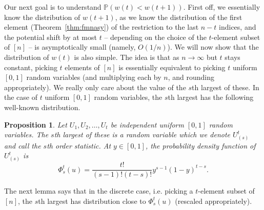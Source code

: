 \documentclass{amsart}
\newtheorem{proposition}[theorem]{Proposition}
\theoremstyle{definition}
\begin{document}
Our next goal is to understand $\mathbb{P}(w(t)<w(t+1))$. First off, we essentially know the distribution of $w(t+1)$, as we know the distribution of the first element (Theorem~\ref{thm:fmnasy}) of the restriction to the last $n-t$ indices, and the potential shift by at most $t$ -- depending on the choice of the $t$-element subset of $[n]$ -- is asymptotically small (namely, $O(1/n)$). We will now show that the distribution of $w(t)$ is also simple. The idea is that as $n\to \infty$ but $t$ stays constant, picking $t$ elements of $[n]$ is essentially equivalent to picking $t$ uniform $[0,1]$ random variables (and multiplying each by $n$, and rounding appropriately). We really only care about the value of the $s$th largest of these. In the case of $t$ uniform $[0,1]$ random variables, the $s$th largest has the following well-known distribution.

\begin{proposition}
Let $U_1,U_2,\ldots,U_t$ be independent uniform $[0,1]$ random variables. The $s$th largest of these is a random variable which we denote $U^t_{(s)}$ and call the \emph{$s$th order statistic}. At $y\in [0,1]$, the probability density function of $U^t_{(s)}$ is 
\[\Phi^t_s(u)=\frac{t!}{(s-1)!(t-s)!}y^{s-1}(1-y)^{t-s}.\]
\end{proposition}

The next lemma says that in the discrete case, i.e. picking a $t$-element subset of $[n]$, the $s$th largest has distribution close to $\Phi^t_s(u)$ (rescaled appropriately).
\end{document}

